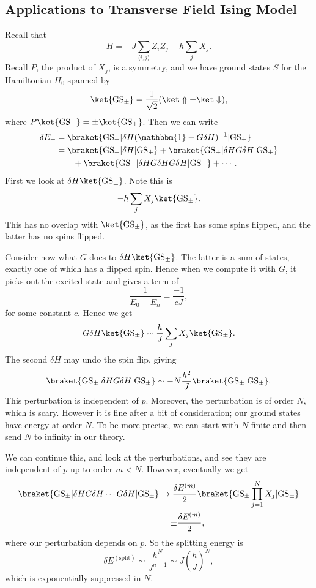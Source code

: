 \documentclass[12pt]{article}
\begin{document}
\subsection{Applications to Transverse Field Ising Model}%
\label{sub:atfim}

Recall that
\[
H = - J \sum_{\langle i, j\rangle} Z_i Z_j - h \sum_j X_j.
\]
Recall $P$, the product of $X_j$, is a symmetry, and we have ground states $S$ for the Hamiltonian $H_0$ spanned by
\[
	\ket{\mathrm{GS}_{\pm}} = \frac1{\sqrt 2} (\ket\Uparrow \pm \ket \Downarrow),
\]
where $P\ket{\mathrm{GS}_{\pm}} = \pm \ket{\mathrm{GS}_{\pm}}$. Then we can write
\begin{align*}
	\delta E_{\pm} &= \braket{\mathrm{GS}_{\pm} | \delta H(\mathbbm{1} - G \delta H)^{-1} | \mathrm{GS}_{\pm}} \\
		       &= \braket{\mathrm{GS}_{\pm} | \delta H| \mathrm{GS}_{\pm}} + \braket{\mathrm{GS}_{\pm} | \delta H G \delta H | \mathrm{GS}_{\pm}} \\
		       &\qquad + \braket{\mathrm{GS}_{\pm} |\delta H G \delta H G \delta H | \mathrm{GS}_{\pm}} + \cdots.
\end{align*}
First we look at $\delta H \ket{\mathrm{GS}_{\pm}}$. Note this is
\[
	-h \sum_j X_j \ket{\mathrm{GS}_{\pm}}.
\]
This has no overlap with $\ket{\mathrm{GS}_{\pm}}$, as the first has some spins flipped, and the latter has no spins flipped.

Consider now what $G$ does to $\delta H \ket{\mathrm{GS}_{\pm}}$. The latter is a sum of states, exactly one of which has a flipped spin. Hence when we compute it with $G$, it picks out the excited state and gives a term of
\[
\frac{1}{E_0 - E_n} = \frac{-1}{c J},
\]
for some constant $c$. Hence we get
\[
	G \delta H \ket{\mathrm{GS}_{\pm}} \sim \frac{h}{J} \sum_j X_j \ket{\mathrm{GS}_{\pm}}.
\]
The second $\delta H$ may undo the spin flip, giving
\[
	\braket{\mathrm{GS}_{\pm} | \delta H G \delta H | \mathrm{GS}_{\pm}} \sim - N \frac{h^2}{J} \braket{\mathrm{GS}_{\pm} | \mathrm{GS}_{\pm}}.
\]
This perturbation is independent of $p$. Moreover, the perturbation is of order $N$, which is scary. However it is fine after a bit of consideration; our ground states have energy at order $N$. To be more precise, we can start with $N$ finite and then send $N$ to infinity in our theory.

We can continue this, and look at the perturbations, and see they are independent of $p$ up to order $m < N$. However, eventually we get
\begin{align*}
	\braket{\mathrm{GS}_{\pm} | \delta H G \delta H \cdots G \delta H | \mathrm{GS}_{\pm}} &\to \frac{\delta E^{(m)}}{2} \braket{\mathrm{GS}_{\pm} \prod_{j = 1}^N X_j | \mathrm{GS}_{\pm}} \\
											       &= \pm \frac{\delta E^{(m)}}{2},
\end{align*}
where our perturbation depends on $p$. So the splitting energy is
\[
\delta E^{(\mathrm{split})} \sim \frac{h^{N}}{J^{n-1}} \sim J \left( \frac{h}{J} \right)^N,
\]
which is exponentially suppressed in $N$.
\end{document}
